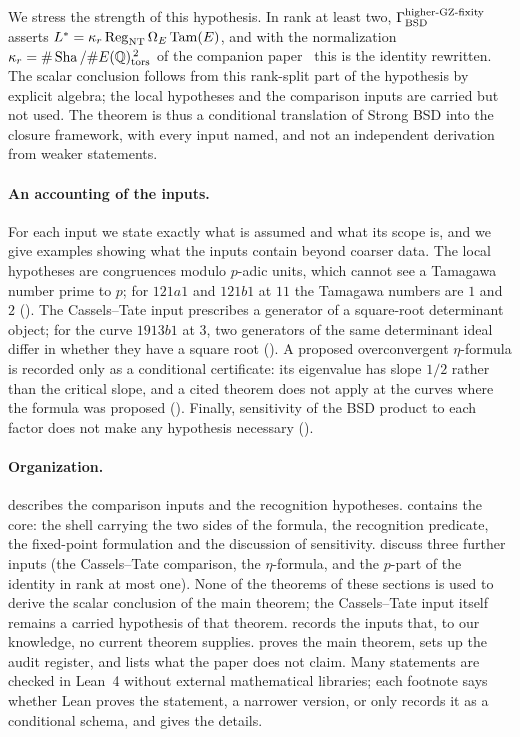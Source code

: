 We stress the strength of this hypothesis.  In rank at least two,
$\Gamma_{\mathrm{BSD}}^{\mathrm{higher\text{-}GZ\text{-}fixity}}$ asserts $L^*=\kappa_r\operatorname{Reg}_{\mathrm{NT}}\Omega_E\operatorname{Tam}(E)$, and with
the normalization $\kappa_r=\#\operatorname{Sha}/\#E(\mathbb{Q})_{\operatorname{tors}}^{\,2}$ of the companion
paper~\citep{TsiokosBSDApparatus2026} this is the identity rewritten.  The
scalar conclusion follows from this rank-split part of the hypothesis by
explicit algebra; the local hypotheses and the comparison inputs are
carried but not used.  The theorem is thus a conditional translation of
Strong BSD into the closure framework, with every input named, and not
an independent derivation from weaker statements.

\paragraph{An accounting of the inputs.}
For each input we state exactly what is assumed and what its scope is,
and we give examples showing what the inputs contain beyond coarser data.
The local hypotheses are congruences modulo $p$-adic units, which cannot
see a Tamagawa number prime to $p$; for $121a1$ and $121b1$ at $11$ the
Tamagawa numbers are $1$ and $2$ ().  The
Cassels--Tate input prescribes a generator of a square-root determinant
object; for the curve $1913b1$ at $3$, two generators of the same
determinant ideal differ in whether they have a square root
().  A proposed overconvergent $\eta$-formula is
recorded only as a conditional certificate: its eigenvalue has slope
$1/2$ rather than the critical slope, and a cited theorem does not apply
at the curves where the formula was proposed ().
Finally, sensitivity of the BSD product to each factor does not make any
hypothesis necessary ().

\paragraph{Organization.}
 describes the comparison inputs and
 the recognition hypotheses.
 contains the core: the shell carrying the two
sides of the formula, the recognition predicate, the fixed-point
formulation and the discussion of sensitivity.
 discuss three further
inputs (the Cassels--Tate comparison, the $\eta$-formula, and the $p$-part
of the identity in rank at most one).  None of the theorems of these
sections is used to derive the scalar conclusion of the main theorem; the
Cassels--Tate input itself remains a carried hypothesis of that theorem.   records the inputs that, to our
knowledge, no current theorem supplies.   proves the
main theorem,  sets up the audit register, and
 lists what the paper does not claim.  Many statements
are checked in Lean~4 without external mathematical libraries; each
footnote says whether Lean proves the statement, a narrower version, or
only records it as a conditional schema, and 
gives the details.

